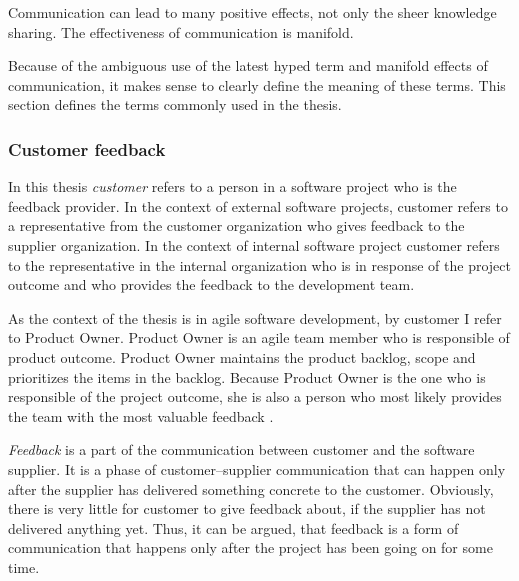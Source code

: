 \documentclass[english,12pt,a4paper,pdftex]{article}
\begin{document}
Communication can lead to many positive effects, not only the sheer knowledge sharing. The effectiveness of communication is manifold.

Because of the ambiguous use of the latest hyped term and manifold effects of communication, it makes sense to clearly define the meaning of these terms. This section defines the terms commonly used in the thesis.

\subsubsection{Customer feedback}

In this thesis \textit{customer} refers to a person in a software project who is the feedback provider. In the context of external software projects, customer refers to a representative from the customer organization who gives feedback to the supplier organization. In the context of internal software project customer refers to the representative in the internal organization who is in response of the project outcome and who provides the feedback to the development team.

As the context of the thesis is in agile software development, by customer I refer to Product Owner. Product Owner is an agile team member who is responsible of product outcome. Product Owner maintains the product backlog, scope and prioritizes the items in the backlog. Because Product Owner is the one who is responsible of the project outcome, she is also a person who most likely provides the team with the most valuable feedback \citep{pichler2010}.

\textit{Feedback} is a part of the communication between customer and the software supplier. It is a phase of customer--supplier communication that can happen only after the supplier has delivered something concrete to the customer. Obviously, there is very little for customer to give feedback about, if the supplier has not delivered anything yet. Thus, it can be argued, that feedback is a form of communication that happens only after the project has been going on for some time.
\end{document}
